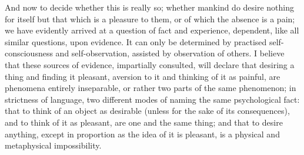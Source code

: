 \documentclass[12pt]{report}
\begin{document}
And now to decide whether this is really so; whether mankind do desire nothing for itself but that which is a pleasure to them, or of which the absence is a pain; we have evidently arrived at a question of fact and experience, dependent, like all similar questions, upon evidence. It can only be determined by practised self-consciousness and self-observation, assisted by observation of others. I believe that these sources of evidence, impartially consulted, will declare that desiring a thing and finding it pleasant, aversion to it and thinking of it as painful, are phenomena entirely inseparable, or rather two parts of the same phenomenon; in strictness of language, two different modes of naming the same psychological fact: that to think of an object as desirable (unless for the sake of its consequences), and to think of it as pleasant, are one and the same thing; and that to desire anything, except in proportion as the idea of it is pleasant, is a physical and metaphysical impossibility.
\end{document}
